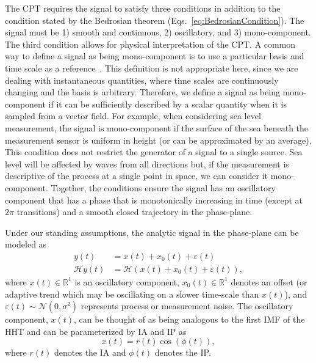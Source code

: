 \documentclass[a4paper]{IEEEtran}
\begin{document}
The CPT requires the signal to satisfy three conditions in addition to the condition stated by the Bedrosian theorem (Eqs.~\ref{eq:BedrosianCondition}). The signal must be 1) smooth and continuous, 2) oscillatory, and 3) mono-component. The third condition allows for physical interpretation of the CPT. A common way to define a signal as being mono-component is to use a particular basis and time scale as a reference~\cite{Boashash1992,Cohen1995}. This definition is not appropriate here, since we are dealing with instantaneous quantities, where time scales are continuously changing and the basis is arbitrary. Therefore, we define a signal as being mono-component if it can be sufficiently described by a scalar quantity when it is sampled from a vector field. For example, when considering sea level measurement, the signal is mono-component if the surface of the sea beneath the measurement sensor is uniform in height (or can be approximated by an average). This condition does not restrict the generator of a signal to a single source. Sea level will be affected by waves from all directions but, if the measurement is descriptive of the process at a single point in space, we can consider it mono-component. Together, the conditions ensure the signal has an oscillatory component that has a phase that is monotonically increasing in time (except at $2\pi$ transitions) and a smooth closed trajectory in the phase-plane. 

Under our standing assumptions, the analytic signal in the phase-plane can be modeled as
\begin{align}\label{eq:SignalModel}
y\left( t \right) &= x\left( t \right) + x_0\left( t \right) + \varepsilon \left( t \right) \\
\mathcal{H}y\left( t \right) &= \mathcal{H}(x\left( t \right) + x_0\left( t \right) + \varepsilon \left( t \right)),
\end{align}
where $x(t) \in \mathbb{R}^1$ is an oscillatory component, $x_0(t) \in \mathbb{R}^1$ denotes an offset (or adaptive trend which may be oscillating on a slower time-scale than $x(t)$), and $\varepsilon(t) \sim \mathcal{N}(0,\sigma^2)$ represents process or measurement noise. The oscillatory component, $x(t)$, can be thought of as being analogous to the first IMF of the HHT and can be parameterized by IA and IP as
\begin{equation}\label{eq:InstAmplitudeAndPhase}
    x\left( t \right) = r\left( t \right)\cos \left( {\phi \left( t \right)} \right),
\end{equation}
where $r(t)$ denotes the IA and $\phi(t)$ denotes the IP. 
\end{document}
